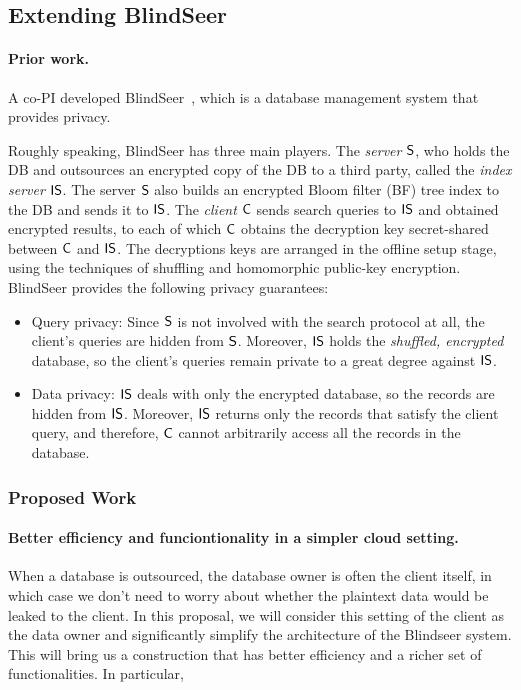 \subsection{Extending BlindSeer}

\paragraph{Prior work.} A co-PI developed
BlindSeer~\cite{SP:PKVKMC14,SP:FVKKKM15}, which is a database management system
that provides privacy.

Roughly speaking, BlindSeer has three main players. The {\em server} $\sf S$,
who holds the DB and outsources an encrypted copy of the DB to a third party,
called the {\em index server} $\sf IS$. The server $\sf S$  also builds an
encrypted Bloom filter (BF) tree index to the DB and sends it to $\sf IS$. The
{\em client} $\sf C$ sends search queries to $\sf IS$ and obtained encrypted
results, to each of which $\sf C$ obtains the decryption key secret-shared
between $\sf C$ and $\sf IS$. The decryptions keys are arranged in the offline
setup stage, using the techniques of shuffling and homomorphic public-key
encryption.
%
BlindSeer provides the following privacy guarantees:
\begin{itemize}
\item Query privacy: Since $\sf S$ is not involved with the search protocol at
  all, the client's queries are hidden from $\sf S$. Moreover, $\sf IS$ holds
    the {\em shuffled, encrypted} database, so the client's queries remain
    private to a great degree against $\sf IS$. 

\item Data privacy: $\sf IS$ deals with only the encrypted database, so the
records are hidden from $\sf IS$. Moreover, $\sf IS$ returns only the records
that satisfy the client query, and therefore, $\sf C$ cannot arbitrarily access
all the records in the database.  
\end{itemize}

\subsubsection{Proposed Work}

\paragraph{Better efficiency and funciontionality in a simpler cloud
setting.} When a database is outsourced, the database owner is often the client
itself, in which case we don't need to worry about whether the plaintext data
would be leaked to the client.  In this proposal, we will consider this setting
of the client as the data owner and significantly simplify the architecture of
the Blindseer system. This will bring us a construction that has better
efficiency and a richer set of functionalities. In particular,

